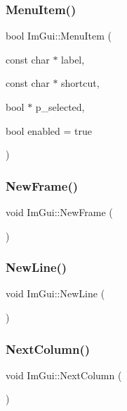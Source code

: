 \subsubsection{\texorpdfstring{Menu\+Item()}{MenuItem()}\hspace{0.1cm}{\footnotesize\ttfamily [2/2]}}
{\footnotesize\ttfamily bool Im\+Gui\+::\+Menu\+Item (\begin{DoxyParamCaption}\item[{const char $\ast$}]{label,  }\item[{const char $\ast$}]{shortcut,  }\item[{bool $\ast$}]{p\+\_\+selected,  }\item[{bool}]{enabled = {\ttfamily true} }\end{DoxyParamCaption})}

\mbox{\label{namespace_im_gui_ab3f1fc018f903b7ad79fd10663375774}} 
\subsubsection{\texorpdfstring{New\+Frame()}{NewFrame()}}
{\footnotesize\ttfamily void Im\+Gui\+::\+New\+Frame (\begin{DoxyParamCaption}{ }\end{DoxyParamCaption})}

\mbox{\label{namespace_im_gui_a77f8b0a33e5335f98661f99e720411da}} 
\subsubsection{\texorpdfstring{New\+Line()}{NewLine()}}
{\footnotesize\ttfamily void Im\+Gui\+::\+New\+Line (\begin{DoxyParamCaption}{ }\end{DoxyParamCaption})}

\mbox{\label{namespace_im_gui_a8f97746d6a9d59c8400c26fb7613a2ff}} 
\subsubsection{\texorpdfstring{Next\+Column()}{NextColumn()}}
{\footnotesize\ttfamily void Im\+Gui\+::\+Next\+Column (\begin{DoxyParamCaption}{ }\end{DoxyParamCaption})}

